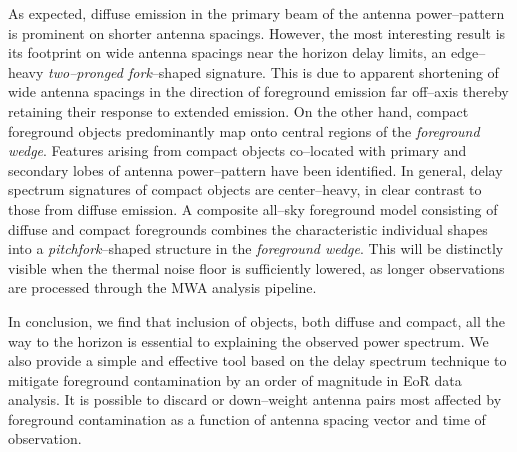 \documentclass[preprint2,iop,numberedappendix]{emulateapj}
\begin{document}
As expected, diffuse emission in the primary beam of the antenna power--pattern is prominent on shorter antenna spacings. However, the most interesting result is its footprint on wide antenna spacings near the horizon delay limits, an edge--heavy {\it two--pronged fork}--shaped signature. This is due to apparent shortening of wide antenna spacings in the direction of foreground emission far off--axis thereby retaining their response to extended emission. On the other hand, compact foreground objects predominantly map onto central regions of the {\it foreground wedge}. Features arising from compact objects co--located with primary and secondary lobes of antenna power--pattern have been identified. In general, delay spectrum signatures of compact objects are center--heavy, in clear contrast to those from diffuse emission. A composite all--sky foreground model consisting of diffuse and compact foregrounds combines the characteristic individual shapes into a {\it pitchfork}--shaped structure in the {\it foreground wedge}. This will be distinctly visible when the thermal noise floor is sufficiently lowered, as longer observations are processed through the MWA analysis pipeline.

In conclusion, we find that inclusion of objects, both diffuse and compact, all the way to the horizon is essential to explaining the observed power spectrum. We also provide a simple and effective tool based on the delay spectrum technique to mitigate foreground contamination by an order of magnitude in EoR data analysis. It is possible to discard or down--weight antenna pairs most affected by foreground contamination as a function of antenna spacing vector and time of observation.

\acknowledgments
\end{document}
